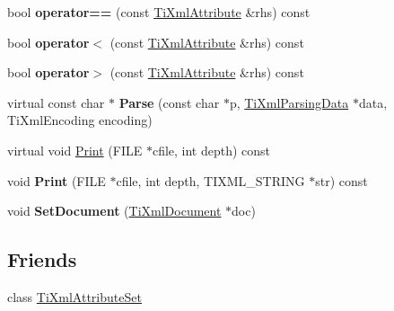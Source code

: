 \begin{DoxyCompactItemize}
\item 
\hypertarget{class_ti_xml_attribute_ae48c2a65b520d453914ce4e845d607cf}{
bool {\bfseries operator==} (const \hyperlink{class_ti_xml_attribute}{TiXmlAttribute} \&rhs) const }
\label{class_ti_xml_attribute_ae48c2a65b520d453914ce4e845d607cf}

\item 
\hypertarget{class_ti_xml_attribute_adb8b6f2cad5948e73e383182e7ce10de}{
bool {\bfseries operator$<$} (const \hyperlink{class_ti_xml_attribute}{TiXmlAttribute} \&rhs) const }
\label{class_ti_xml_attribute_adb8b6f2cad5948e73e383182e7ce10de}

\item 
\hypertarget{class_ti_xml_attribute_a867562769ef9778c1690cd373246b05b}{
bool {\bfseries operator$>$} (const \hyperlink{class_ti_xml_attribute}{TiXmlAttribute} \&rhs) const }
\label{class_ti_xml_attribute_a867562769ef9778c1690cd373246b05b}

\item 
\hypertarget{class_ti_xml_attribute_ad62774421b814894b995af3b5d231dda}{
virtual const char $\ast$ {\bfseries Parse} (const char $\ast$p, \hyperlink{class_ti_xml_parsing_data}{TiXmlParsingData} $\ast$data, TiXmlEncoding encoding)}
\label{class_ti_xml_attribute_ad62774421b814894b995af3b5d231dda}

\item 
virtual void \hyperlink{class_ti_xml_attribute_acc04956c1d5c4c31fe74f7a7528d109a}{Print} (FILE $\ast$cfile, int depth) const 
\item 
\hypertarget{class_ti_xml_attribute_a19e6b6862a80b188571c47947e88d030}{
void {\bfseries Print} (FILE $\ast$cfile, int depth, TIXML\_\-STRING $\ast$str) const }
\label{class_ti_xml_attribute_a19e6b6862a80b188571c47947e88d030}

\item 
\hypertarget{class_ti_xml_attribute_ac12a94d4548302afb12f488ba101f7d1}{
void {\bfseries SetDocument} (\hyperlink{class_ti_xml_document}{TiXmlDocument} $\ast$doc)}
\label{class_ti_xml_attribute_ac12a94d4548302afb12f488ba101f7d1}

\end{DoxyCompactItemize}
\subsection*{Friends}
\begin{DoxyCompactItemize}
\item 
\hypertarget{class_ti_xml_attribute_a35a7b7f89f708527677d5078d41ce0bf}{
class \hyperlink{class_ti_xml_attribute_a35a7b7f89f708527677d5078d41ce0bf}{TiXmlAttributeSet}}
\label{class_ti_xml_attribute_a35a7b7f89f708527677d5078d41ce0bf}

\end{DoxyCompactItemize}



